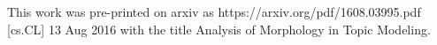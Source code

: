 \documentclass[11pt,letterpaper]{article}
\begin{document}
This work was pre-printed on arxiv as
https://arxiv.org/pdf/1608.03995.pdf [cs.CL] 13 Aug 2016 with the title
Analysis of Morphology in Topic Modeling.
\end{document}
